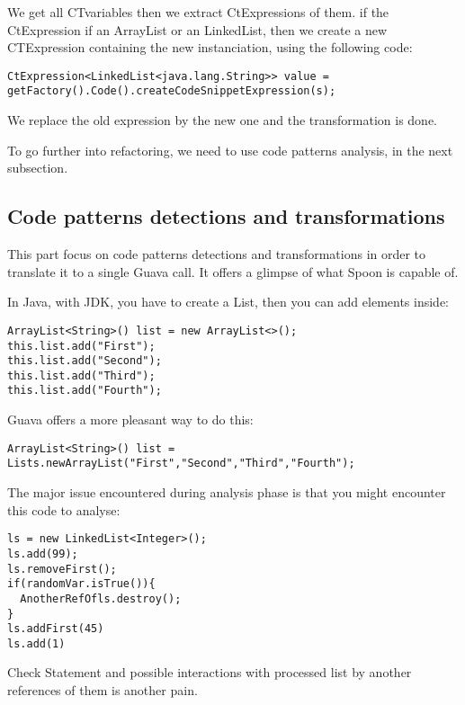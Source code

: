 \documentclass[paper=a4, fontsize=11pt]{scrartcl}
\numberwithin{equation}{section}%
\numberwithin{figure}{section}%
\numberwithin{table}{section}%
\begin{document}
We get all CTvariables then we extract CtExpressions of them. if the
CtExpression if an ArrayList or an LinkedList, then we create a new
CTExpression containing the new instanciation, using the following
code:

\begin{verbatim}
CtExpression<LinkedList<java.lang.String>> value =
getFactory().Code().createCodeSnippetExpression(s);
\end{verbatim}

We replace the old expression by the new one and the transformation is
done.\newline

To go further into refactoring, we need to use code patterns analysis,
in the next subsection.

\subsection{Code patterns detections and transformations}

This part focus on code patterns detections and transformations in
order to translate it to a single Guava call. It offers a glimpse of
what Spoon is capable of.\newline

In Java, with JDK, you have to create a List, then you can add
elements inside:
\begin{verbatim}
ArrayList<String>() list = new ArrayList<>();
this.list.add("First");
this.list.add("Second");
this.list.add("Third");
this.list.add("Fourth");
\end{verbatim}

Guava offers a more pleasant way to do this:
\begin{verbatim}
ArrayList<String>() list =
Lists.newArrayList("First","Second","Third","Fourth");
\end{verbatim}

The major issue encountered during analysis phase is that you might
encounter this code to analyse:

\begin{verbatim}
ls = new LinkedList<Integer>();
ls.add(99);
ls.removeFirst();
if(randomVar.isTrue()){
  AnotherRefOfls.destroy();
}
ls.addFirst(45)
ls.add(1)
\end{verbatim}


Check Statement and possible interactions with processed list by
another references of them is another pain.\newline
\end{document}
